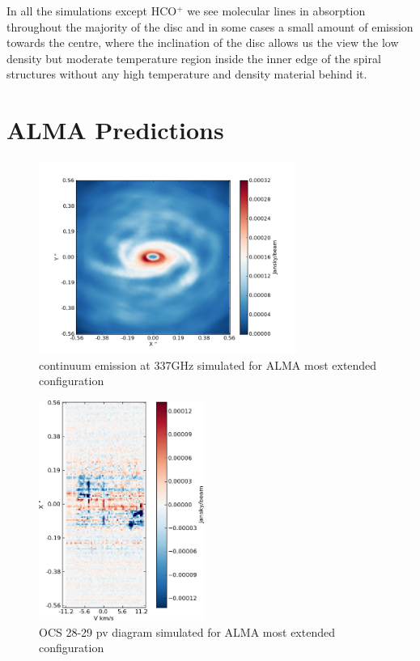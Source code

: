\documentclass[useAMS,usenatbib]{mn2e}
\begin{document}
In all the simulations except HCO$^+$ we see molecular lines in absorption throughout the majority of the disc and in some cases a small amount of emission towards the centre, where the inclination of the disc allows us the view the low density but moderate temperature region inside the inner edge of the spiral structures without any high temperature and density material behind it.\newline




\section{ALMA Predictions}



\begin{figure}
 \includegraphics[width=84mm]{Figures/sim/casa_cont_337GHz.png}

 \caption{continuum emission at 337GHz simulated for ALMA most extended configuration}
\end{figure}

\begin{figure}
 \includegraphics[width=54mm]{Figures/sim/casa_OCS_28-27_pv.png}

 \caption{OCS 28-29 pv diagram simulated for ALMA most extended configuration}
\end{figure}
\end{document}
